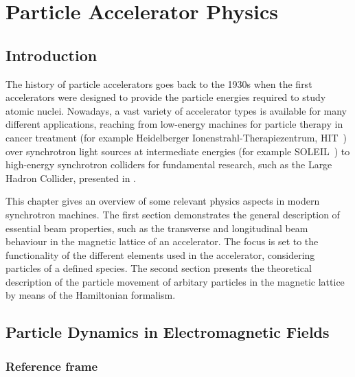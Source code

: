 \chapter{Particle Accelerator Physics}\label{chap:2}
%
\section*{Introduction}
%
The history of particle accelerators goes back to the 1930s when the first accelerators were designed to provide the particle energies required to study atomic nuclei. Nowadays, a vast variety of accelerator types is available for many different applications, reaching from low-energy machines for particle therapy in cancer treatment (for example Heidelberger Ionenstrahl-Therapiezentrum, HIT~\cite{HITref01}) over synchrotron light sources at intermediate energies (for example SOLEIL~\cite{SOLEILref01}) to high-energy synchrotron colliders for fundamental research, such as the Large Hadron Collider, presented in .

This chapter gives an overview of some relevant physics aspects in modern synchrotron machines. The first section demonstrates the general description of essential beam properties, such as the transverse and longitudinal beam behaviour in the magnetic lattice of an accelerator. The focus is set to the functionality of the different elements used in the accelerator, considering particles of a defined species. The second section presents the theoretical description of the particle movement of arbitary particles in the magnetic lattice by means of the Hamiltonian formalism. 
%

\section{Particle Dynamics in Electromagnetic Fields}

\subsection{Reference frame} \label{chap:refframe}






